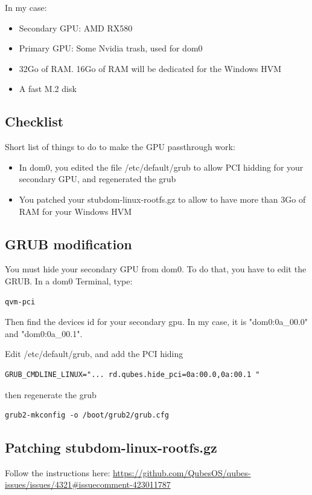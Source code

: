 \documentclass[12pt]{article}
\begin{document}
In my case:
\begin{itemize}
  \item Secondary GPU: AMD RX580
  \item Primary GPU: Some Nvidia trash, used for dom0
  \item 32Go of RAM. 16Go of RAM will be dedicated for the Windows HVM
  \item A fast M.2 disk
\end{itemize}

\subsection{Checklist}
Short list of things to do to make the GPU passthrough work:
\begin{itemize}
\item In dom0, you edited the file /etc/default/grub to allow PCI hidding for your secondary GPU, and regenerated the grub
\item You patched your stubdom-linux-rootfs.gz to allow to have more than 3Go of RAM for your Windows HVM
\end{itemize}

\subsection{GRUB modification}
You must hide your secondary GPU from dom0.
To do that, you have to edit the GRUB.
In a dom0 Terminal, type:
\begin{verbatim}
qvm-pci
\end{verbatim}
Then find the devices id for your secondary gpu. In my case, it is "dom0:0a\_00.0" and "dom0:0a\_00.1".

Edit /etc/default/grub, and add the PCI hiding

\begin{verbatim}
GRUB_CMDLINE_LINUX="... rd.qubes.hide_pci=0a:00.0,0a:00.1 "
\end{verbatim}

then regenerate the grub
\begin{verbatim}
grub2-mkconfig -o /boot/grub2/grub.cfg
\end{verbatim}

\subsection{Patching stubdom-linux-rootfs.gz}
Follow the instructions here:
\href{https://github.com/QubesOS/qubes-issues/issues/4321\#issuecomment-423011787}{https://github.com/QubesOS/qubes-issues/issues/4321\#issuecomment-423011787}
\end{document}
